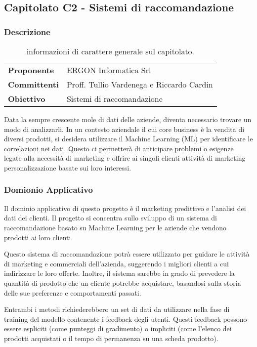 \subsection{Capitolato C2 - Sistemi di raccomandazione} \label{sec:c2}
	\subsubsection{Descrizione}
	
		\begin{table}[H]
			\begin{tabularx}{\textwidth}{p{5cm}|X}
				\toprule
				\textbf{Proponente} & ERGON Informatica Srl
				\\
				\textbf{Committenti} & Proff. Tullio Vardenega e Riccardo Cardin
				\\
				\textbf{Obiettivo} & Sistemi di raccomandazione
				\\\toprule
			\end{tabularx}
			\caption{informazioni di carattere generale sul capitolato.}
		\end{table}
		
		Data la sempre crescente mole di dati delle aziende, diventa necessario trovare un modo di analizzarli. In un contesto aziendale il cui core business è la vendita di diversi prodotti, si desidera utilizzare il Machine Learning (ML) per identificare le correlazioni nei dati. Questo ci permetterà di anticipare problemi o esigenze legate alla necessità di marketing e offrire ai singoli clienti attività di marketing personalizzazione basate sui loro interessi.
		
	\subsubsection{Domionio Applicativo}
		Il dominio applicativo di questo progetto è il marketing predittivo e l'analisi dei dati dei clienti. Il progetto si concentra sullo sviluppo di un sistema di raccomandazione basato su Machine Learning per le aziende che vendono prodotti ai loro clienti.
		
		Questo sistema di raccomandazione potrà essere utilizzato per guidare le attività di marketing e commerciali dell'azienda, suggerendo i migliori clienti a cui indirizzare le loro offerte. Inoltre, il sistema sarebbe in grado di prevedere la quantità di prodotto che un cliente potrebbe acquistare, basandosi sulla storia delle sue preferenze e comportamenti passati.
		
		Entrambi i metodi richiederebbero un set di dati da utilizzare nella fase di training del modello contenente i feedback degli utenti. Questi feedback possono essere espliciti (come punteggi di gradimento) o impliciti (come l’elenco dei prodotti acquistati o il
		tempo di permanenza su una scheda prodotto).
		
